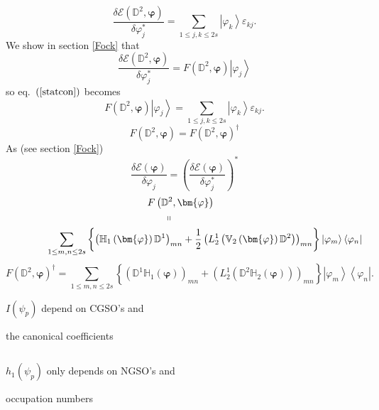 \documentclass[aps,preprint]{revtex4}%
\begin{document}
\bigskip%

\[
\frac{\delta\mathcal{E}\left(  \mathbb{D}^{2},\bm{\varphi}\right)  }%
{\delta\varphi_{j}^{\ast}}=\sum_{1\leq j,k\leq2s}\left\vert \varphi
_{k}\right\rangle \varepsilon_{kj}.
\]
We show in section \ref{Fock} that
\[
\frac{\delta\mathcal{E}\left(  \mathbb{D}^{2},\bm{\varphi}\right)  }%
{\delta\varphi_{j}^{\ast}}=F\left(  \mathbb{D}^{2},\bm{\varphi}\right)
\left\vert \varphi_{j}\right\rangle
\]
so eq.\ $\left(  \ref{statcon}\right)  $ becomes
\[
F\left(  \mathbb{D}^{2},\bm{\varphi}\right)  \left\vert \varphi_{j}%
\right\rangle =\sum_{1\leq j,k\leq2s}\left\vert \varphi_{k}\right\rangle
\varepsilon_{kj}.
\]%
\[
F\left(  \mathbb{D}^{2},\bm{\varphi}\right)  =F\left(  \mathbb{D}%
^{2},\bm{\varphi}\right)  ^{\dagger}%
\]
As (see section \ref{Fock})%
\[
\frac{\delta\mathcal{E}\left(  \bm{\varphi}\right)  }{\delta\varphi_{j}%
}=\left(  \frac{\delta\mathcal{E}\left(  \bm{\varphi}\right)  }{\delta
\varphi_{j}^{\ast}}\right)  ^{\ast}%
\]
\begin{subequations}
\label{Fock_Op}%
\begin{align*}
\qquad\qquad &  \qquad\qquad\qquad\qquad\qquad\left.  F\left(  \mathbb{D}%
^{2},\bm{\varphi}\right)  \right. \\
&  \qquad\qquad\qquad\qquad\qquad\qquad\left.  \shortparallel\right. \\
&  \sum_{1\leq m,n\leq2s}\left\{  \left(  \mathbb{H}_{1}\left(
\bm{\varphi}\right)  \mathbb{D}^{1}\right)  _{mn}+\frac{1}{2}\left(  L_{2}%
^{1}\left(  \mathbb{V}_{2}\left(  \bm{\varphi}\right)  \mathbb{D}^{2}\right)
\right)  _{mn}\right\}  \left\vert \varphi_{m}\right\rangle \left\langle
\varphi_{n}\right\vert
\end{align*}%
\end{subequations}
\[
F\left(  \mathbb{D}^{2},\bm{\varphi}\right)  ^{\dagger}=\sum_{1\leq m,n\leq
2s}\left\{  \left(  \mathbb{D}^{1}\mathbb{H}_{1}\left(  \bm{\varphi }\right)
\right)  _{mn}+\left(  L_{2}^{1}\left(  \mathbb{D}^{2}\mathbb{H}_{2}\left(
\bm{\varphi}\right)  \right)  \right)  _{mn}\right\}  \left\vert \varphi
_{m}\right\rangle \left\langle \varphi_{n}\right\vert .
\]


$I\left(  \psi_{p}\right)  $ depend on CGSO's and

the canonical coefficients%

\[
\left.  {}\right.
\]


$h_{1}\left(  \psi_{p}\right)  $ only depends on NGSO's and

occupation numbers
\end{document}
